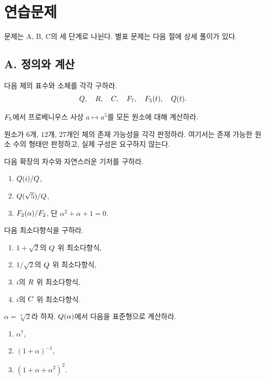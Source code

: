 \section{연습문제}
\label{sec:field-extension-exercises}

문제는 A, B, C의 세 단계로 나뉜다. 별표 문제는 다음 절에 상세 풀이가 있다.

\subsection*{A. 정의와 계산}

\begin{exercise}
다음 체의 표수와 소체를 각각 구하라.
\[
  Q,\quad R,\quad C,\quad F_7,\quad F_5(t),\quad Q(t).
\]
\end{exercise}

\begin{exercise}
$F_5$에서 프로베니우스 사상 $a\mapsto a^5$를 모든 원소에 대해 계산하라.
\end{exercise}

\begin{exercise}
원소가 $6$개, $12$개, $27$개인 체의 존재 가능성을 각각 판정하라. 여기서는 존재 가능한 원소 수의 형태만 판정하고, 실제 구성은 요구하지 않는다.
\end{exercise}

\begin{exercise}[*]
다음 확장의 차수와 자연스러운 기저를 구하라.
\begin{enumerate}[label=(\alph*)]
  \item $Q(i)/Q$,
  \item $Q(\sqrt5)/Q$,
  \item $F_2(\alpha)/F_2$, 단 $\alpha^2+\alpha+1=0$.
\end{enumerate}
\end{exercise}

\begin{exercise}
다음 최소다항식을 구하라.
\begin{enumerate}[label=(\alph*)]
  \item $1+\sqrt2$의 $Q$ 위 최소다항식,
  \item $1/\sqrt2$의 $Q$ 위 최소다항식,
  \item $i$의 $R$ 위 최소다항식,
  \item $i$의 $C$ 위 최소다항식.
\end{enumerate}
\end{exercise}

\begin{exercise}[*]
$\alpha=\sqrt[3]{2}$라 하자. $Q(\alpha)$에서 다음을 표준형으로 계산하라.
\begin{enumerate}[label=(\alph*)]
  \item $\alpha^7$,
  \item $(1+\alpha)^{-1}$,
  \item $(1+\alpha+\alpha^2)^2$.
\end{enumerate}
\end{exercise}

